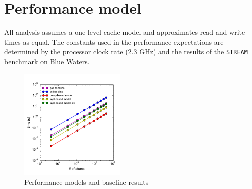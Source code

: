 \documentclass[12pt]{article}
\begin{document}
\section{Performance model}
All analysis assumes a one-level cache model and approximates read and write 
times as equal.  The constants used in the performance expectations are determined 
by the processor clock rate (2.3 GHz) and the results of the \texttt{STREAM} benchmark 
on Blue Waters. \\

\begin{figure}[h!]
  \centering
  \includegraphics[width=0.45\textwidth]{../figs/compiler_forceLJ.pdf}
  \caption{Performance models and baseline results}
  \label{fig:perf-models}
\end{figure}
\end{document}
